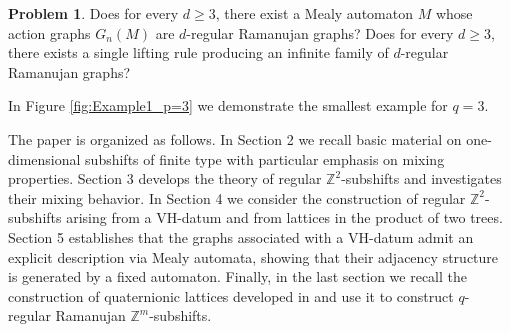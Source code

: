 \documentclass[12pt]{article}
\theoremstyle{definition}
\newtheorem{problem}{Problem}
\newcommand{\WangTileC}[5]{%
\begin{pspicture}(0,0)
\pgfmathsetmacro{\HalfEdge}{#5/2}
\pspolygon*[linecolor=#1](0,0)(0,-#5)(\HalfEdge,-\HalfEdge)
\pspolygon*[linecolor=#4](0,-#5)(#5,-#5)(\HalfEdge,-\HalfEdge)
\pspolygon*[linecolor=#3](#5,-#5)(#5,0)(\HalfEdge,-\HalfEdge)
\pspolygon*[linecolor=#2](#5,0)(0,0)(\HalfEdge,-\HalfEdge)
\end{pspicture}}
\begin{document}
\begin{problem}
Does for every $d\geq 3$, there exist a Mealy automaton $M$ whose action graphs $G_n(M)$ are $d$-regular Ramanujan graphs?
Does for every $d\geq 3$, there exists a single lifting rule producing an infinite family of $d$-regular Ramanujan graphs?
\end{problem}

In Figure \ref{fig:Example1_p=3} we demonstrate the smallest example for $q=3$.

\vspace{0.2cm}
The paper is organized as follows. In Section 2 we recall basic material on one-dimensional subshifts of finite type with particular emphasis on mixing properties. Section 3 develops the theory of regular $\mathbb{Z}^2$-subshifts and investigates their mixing behavior. In Section 4 we consider the construction of regular $\mathbb{Z}^2$-subshifts arising from a VH-datum and from lattices in the product of two trees. Section 5 establishes that the graphs associated with a VH-datum admit an explicit description via Mealy automata, showing that their adjacency structure is generated by a fixed automaton. Finally, in the last section we recall the construction of quaternionic lattices developed in \cite{RSV2019} and use it to construct $q$-regular Ramanujan $\mathbb{Z}^m$-subshifts.




\newcommand{\WangTileax}[1]{\WangTileC{cyan}{yellow}{orange}{purple}{#1}}
\newcommand{\WangTileay}[1]{\WangTileC{cyan}{pink}{blue}{yellow}{#1}}
\newcommand{\WangTileayi}[1]{\WangTileC{cyan}{red}{green}{pink}{#1}}
\newcommand{\WangTileaxi}[1]{\WangTileC{cyan}{purple}{blue}{red}{#1}}
\newcommand{\WangTileaix}[1]{\WangTileC{blue}{yellow}{cyan}{pink}{#1}}
\newcommand{\WangTileaiy}[1]{\WangTileC{blue}{pink}{orange}{red}{#1}}
\newcommand{\WangTileaiyi}[1]{\WangTileC{blue}{red}{cyan}{purple}{#1}}
\newcommand{\WangTileaixi}[1]{\WangTileC{blue}{purple}{green}{yellow}{#1}}
\newcommand{\WangTilebx}[1]{\WangTileC{green}{yellow}{blue}{purple}{#1}}
\newcommand{\WangTileby}[1]{\WangTileC{green}{pink}{cyan}{red}{#1}}
\newcommand{\WangTilebyi}[1]{\WangTileC{green}{red}{orange}{yellow}{#1}}
\newcommand{\WangTilebxi}[1]{\WangTileC{green}{purple}{orange}{pink}{#1}}
\newcommand{\WangTilebix}[1]{\WangTileC{orange}{yellow}{green}{red}{#1}}
\newcommand{\WangTilebiy}[1]{\WangTileC{orange}{pink}{green}{purple}{#1}}
\newcommand{\WangTilebiyi}[1]{\WangTileC{orange}{red}{blue}{pink}{#1}}
\newcommand{\WangTilebixi}[1]{\WangTileC{orange}{purple}{cyan}{yellow}{#1}}
\end{document}
